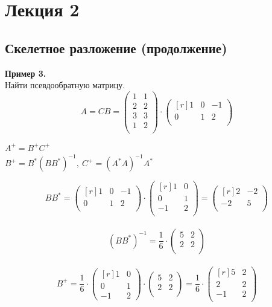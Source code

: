 \newpage
\section{Лекция 2}
\subsection{Скелетное разложение (продолжение)}
\noindent \textbf{Пример 3.}\\
Найти псевдообратную матрицу.\\
\[A = CB = \begin{pmatrix}
1 & 1 \\         
2 & 2 \\
3 & 3 \\
1 & 2 \\
\end{pmatrix} \cdot \begin{pmatrix}[r]
1 & 0 & -1 \\         
0 & 1 & 2 \\
\end{pmatrix}\]
\begin{center}
    $A^+=B^+C^+$\\
    $B^+=B^*(BB^*)^{-1}, ~C^+=(A^*A)^{-1}A^*$\\
\end{center}
\[BB^* = \begin{pmatrix}[r]
1 & 0 & -1 \\         
0 & 1 & 2 \\
\end{pmatrix} \cdot \begin{pmatrix}[r]
1 & 0 \\         
0 & 1 \\
-1 & 2 \\
\end{pmatrix} =  \begin{pmatrix}[r]
2 & -2 \\         
-2 & 5 \\
\end{pmatrix}\]\\
\[(BB^*)^{-1} = \frac{1}{6} \cdot \begin{pmatrix}
5 & 2 \\         
2 & 2 \\
\end{pmatrix}\]\\
\[B^+ = \frac{1}{6} \cdot \begin{pmatrix}[r]
1 & 0 \\         
0 & 1 \\
-1 & 2
\end{pmatrix} \cdot \begin{pmatrix}
5 & 2 \\         
2 & 2 \\
\end{pmatrix} = \frac{1}{6} \cdot \begin{pmatrix}[r]
5 & 2 \\         
2 & 2 \\
-1 & 2 \\
\end{pmatrix}\]\\
